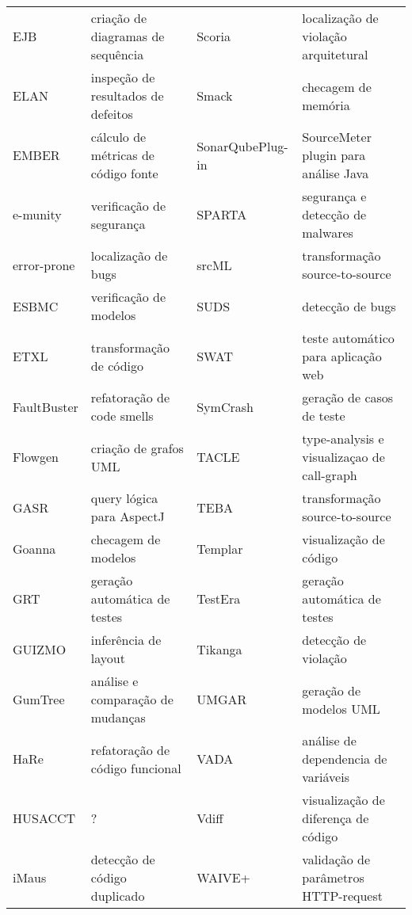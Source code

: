 \begin{table}[h]
{\begin{tabular}{| l | l | l | l |}
  EJB            & criação de diagramas de sequência    & Scoria           & localização de violação arquitetural \\
  ELAN           & inspeção de resultados de defeitos   & Smack            & checagem de memória                  \\
  EMBER          & cálculo de métricas de código fonte  & SonarQubePlug-in & SourceMeter plugin para análise Java \\
  e-munity       & verificação de segurança             & SPARTA           & segurança e detecção de malwares     \\
  error-prone    & localização de bugs                  & srcML            & transformação source-to-source       \\
  ESBMC          & verificação de modelos               & SUDS             & detecção de bugs                     \\
  ETXL           & transformação de código              & SWAT             & teste automático para aplicação web  \\
  FaultBuster    & refatoração de code smells           & SymCrash         & geração de casos de teste            \\
  Flowgen        & criação de grafos UML                & TACLE            & type-analysis e visualizaçao de call-graph \\
  GASR           & query lógica para AspectJ            & TEBA             & transformação source-to-source       \\
  Goanna         & checagem de modelos                  & Templar          & visualização de código               \\
  GRT            & geração automática de testes         & TestEra          & geração automática de testes         \\
  GUIZMO         & inferência de layout                 & Tikanga          & detecção de violação                 \\
  GumTree        & análise e comparação de mudanças     & UMGAR            & geração de modelos UML               \\
  HaRe           & refatoração de código funcional      & VADA             & análise de dependencia de variáveis  \\
  HUSACCT        & ?                                    & Vdiff            & visualização de diferença de código  \\
  iMaus          & detecção de código duplicado         & WAIVE+           & validação de parâmetros HTTP-request \\

\end{tabular}}
\end{table}
